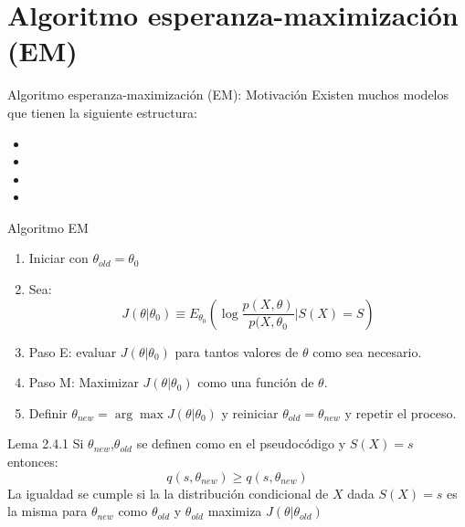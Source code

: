 \documentclass[aspectratio=169,xcolor=dvipsnames]{beamer}
\begin{document}

    \section{Algoritmo esperanza-maximización (EM)}

\begin{frame}{Algoritmo esperanza-maximización (EM): Motivación}
Existen muchos modelos que tienen la siguiente estructura:  
    \begin{itemize}
        \item {}
        \item {}
        \item {}
        \item {}
    \end{itemize}
\end{frame}

\begin{frame}{Algoritmo EM}
\begin{enumerate}
    \item Iniciar con $\theta_{old}=\theta_0$
    \item Sea:
    $$J(\theta|\theta_0)\equiv E_{\theta_{0}}(\log \frac{p(X,\theta)}{p(X,\theta_0}|S(X)=S)$$
    \item Paso E: evaluar $J(\theta|\theta_0)$ para tantos valores de $\theta$ como sea necesario.
    \item Paso M: Maximizar $J(\theta|\theta_0)$ como una función de $\theta$.
    \item Definir $\theta_{new}=\arg \max J(\theta|\theta_0)$
    y reiniciar $\theta_{old}=\theta_{new}$ y repetir el proceso. 
\end{enumerate}
\begin{block}{Lema 2.4.1}
Si $\theta_{new}$,$\theta_{old}$ se definen como en el pseudocódigo y $S(X)=s$ entonces: 
$$q(s,\theta_{new}) \geq q(s,\theta_{new})$$
La igualdad se cumple si la la distribución condicional de $X$ dada $S(X)=s$ es la misma para $\theta_{new}$ como $\theta_{old}$ y $\theta_{old}$ maximiza $J(\theta|\theta_{old})$
\end{block}
\end{frame}
\end{document}
